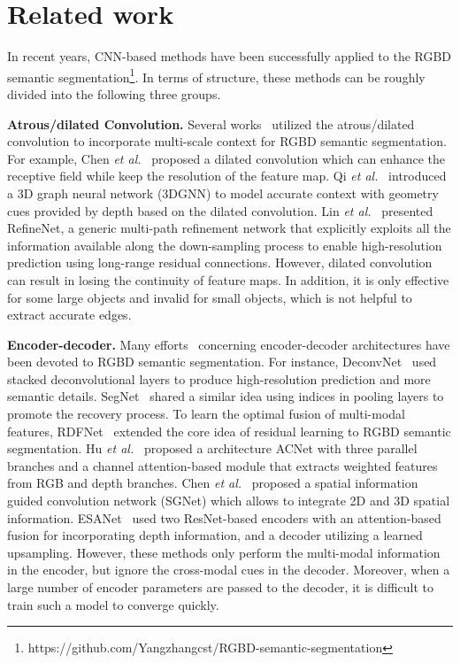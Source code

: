 \documentclass[10pt,twocolumn,letterpaper]{article}
\begin{document}
\section{Related work} \label{sec:Relatedwork}

In recent years, CNN-based methods have been successfully applied to the RGBD semantic segmentation\footnote{https://github.com/Yangzhangcst/RGBD-semantic-segmentation}. In terms of structure, these methods can be roughly divided into the following three groups.

\textbf{Atrous/dilated Convolution.}
Several works~\cite{Chen:ICL15,Gadde:ECCV16,Lin:ICCV17,Qi:ICCV17,Wang:ECCV18,Lin:TPAMI20} utilized the atrous/dilated convolution to incorporate multi-scale context for RGBD semantic segmentation. For example, Chen \textit{et al.}~\cite{Chen:ICL15} proposed a dilated convolution which can enhance the receptive field while keep the resolution of the feature map. Qi \textit{et al.}~\cite{Qi:ICCV17} introduced a 3D graph neural network (3DGNN) to model accurate context with geometry cues provided by depth based on the dilated convolution. Lin \textit{et al.}~\cite{Lin:TPAMI20} presented RefineNet, a generic multi-path refinement network that explicitly exploits all the information available along the down-sampling process to enable high-resolution prediction using long-range residual connections. However, dilated convolution can result in losing the continuity of feature maps. In addition, it is only effective for some large objects and invalid for small objects, which is not helpful to extract accurate edges.

\textbf{Encoder-decoder.}
Many efforts~\cite{Noh:ICCV15,Badri:TPAMI17,Cheng:CVPR17,Hazirbas:ACCV17,Kendall:BMVC17,
	Shelhamer:TPAMI17,Lee:ICCV17,Jiang:arXiv18,Tang:arXiv20,Zhou:ACCV20,Chen:arXiv20,Xing:ECCV20,
	Chen:ECCV20,Seichter:arXiv20} concerning encoder-decoder architectures have been devoted to RGBD semantic segmentation. For instance, DeconvNet~\cite{Noh:ICCV15} used stacked deconvolutional layers to produce high-resolution prediction and more semantic details. SegNet~\cite{Badri:TPAMI17} shared a similar idea using indices in pooling layers to promote the recovery process. To learn the optimal fusion of multi-modal features, RDFNet~\cite{Lee:ICCV17} extended the core idea of residual learning to RGBD semantic segmentation. Hu \textit{et al.}~\cite{Hu:ICIP19} proposed a architecture ACNet with three parallel branches and a channel attention-based module that extracts weighted features from RGB and depth branches.  Chen \textit{et al.}~\cite{Chen:arXiv20} proposed a spatial information guided convolution network (SGNet) which allows to integrate 2D and 3D spatial information. ESANet~\cite{Seichter:arXiv20} used two ResNet-based encoders with an attention-based fusion for incorporating depth information, and a decoder utilizing a learned upsampling. However, these methods only perform the multi-modal information in the encoder, but ignore the cross-modal cues in the decoder. Moreover, when a large number of encoder parameters are passed to the decoder, it is difficult to train such a model to converge quickly.
\end{document}
